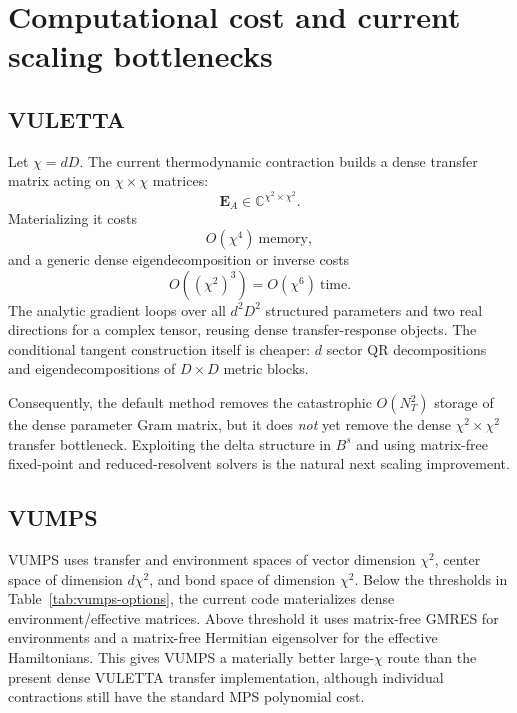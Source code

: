 \documentclass[11pt]{article}
\newcommand{\CC}{\mathbb{C}}
\begin{document}
\section{Computational cost and current scaling bottlenecks}
\label{sec:complexity}

\subsection{VULETTA}

Let $\chi=dD$.  The current thermodynamic contraction builds a dense transfer
matrix acting on $\chi\times\chi$ matrices:
\begin{equation}
  \mathbf E_A\in\CC^{\chi^2\times\chi^2}.
  \label{eq:dense-transfer-shape}
\end{equation}
Materializing it costs
\begin{equation}
  O(\chi^4)\ \text{memory},
  \label{eq:dense-transfer-memory}
\end{equation}
and a generic dense eigendecomposition or inverse costs
\begin{equation}
  O((\chi^2)^3)=O(\chi^6)
  \ \text{time}.
  \label{eq:dense-transfer-time}
\end{equation}
The analytic gradient loops over all $d^2D^2$ structured parameters and two
real directions for a complex tensor, reusing dense transfer-response
objects.  The conditional tangent construction itself is cheaper: $d$
sector QR decompositions and eigendecompositions of $D\times D$ metric blocks.

Consequently, the default method removes the catastrophic
$O(N_T^2)$ storage of the dense parameter Gram matrix, but it does
\emph{not} yet remove the dense $\chi^2\times\chi^2$ transfer bottleneck.
Exploiting the delta structure in $B^s$ and using matrix-free fixed-point and
reduced-resolvent solvers is the natural next scaling improvement.

\subsection{VUMPS}

VUMPS uses transfer and environment spaces of vector dimension $\chi^2$,
center space of dimension $d\chi^2$, and bond space of dimension $\chi^2$.
Below the thresholds in Table~\ref{tab:vumps-options}, the current code
materializes dense environment/effective matrices.  Above threshold it uses
matrix-free GMRES for environments and a matrix-free Hermitian eigensolver
for the effective Hamiltonians.  This gives VUMPS a materially better
large-$\chi$ route than the present dense VULETTA transfer implementation,
although individual contractions still have the standard MPS polynomial
cost.
\end{document}
